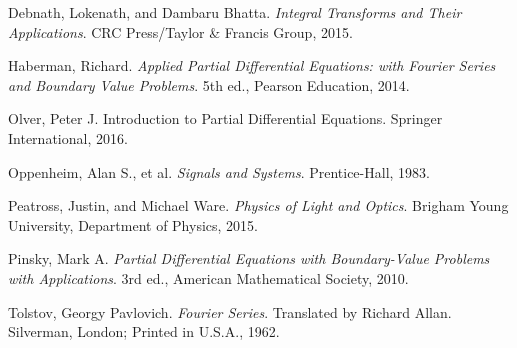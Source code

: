 \documentclass[12pt,letterpaper]{article}
\begin{document}
\begin{thebibliography}{9}

Debnath, Lokenath, and Dambaru Bhatta. \textit{Integral Transforms and Their Applications}. CRC Press/Taylor \& Francis Group, 2015.

Haberman, Richard. \textit{Applied Partial Differential Equations: with Fourier Series and Boundary Value Problems}. 5th ed., Pearson Education, 2014.

Olver, Peter J. Introduction to Partial Differential Equations. Springer International, 2016.

Oppenheim, Alan S., et al. \textit{Signals and Systems}. Prentice-Hall, 1983.

Peatross, Justin, and Michael Ware. \textit{Physics of Light and Optics}. Brigham Young University, Department of Physics, 2015.

Pinsky, Mark A. \textit{Partial Differential Equations with Boundary-Value Problems with Applications}. 3rd ed., American Mathematical Society, 2010.

Tolstov, Georgy Pavlovich. \textit{Fourier Series}. Translated by Richard Allan. Silverman, London; Printed in U.S.A., 1962.

\end{thebibliography}


\end{document}
